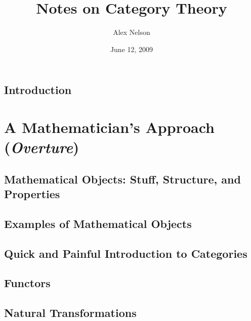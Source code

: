\documentclass[draft]{amsart}
\title{Notes on Category Theory}
\date{June 12, 2009} %
\author{Alex Nelson}
\theoremstyle{plain}
\theoremstyle{definition}
\begin{document}
\maketitle{}
\tableofcontents
\listoftables
\section{Introduction}



\chapter{A Mathematician's Approach (\emph{Overture})}
\section{Mathematical Objects: Stuff, Structure, and Properties}

\section{Examples of Mathematical Objects}

\section{Quick and Painful Introduction to Categories}

\section{Functors}

\section{Natural Transformations}


\end{document}
